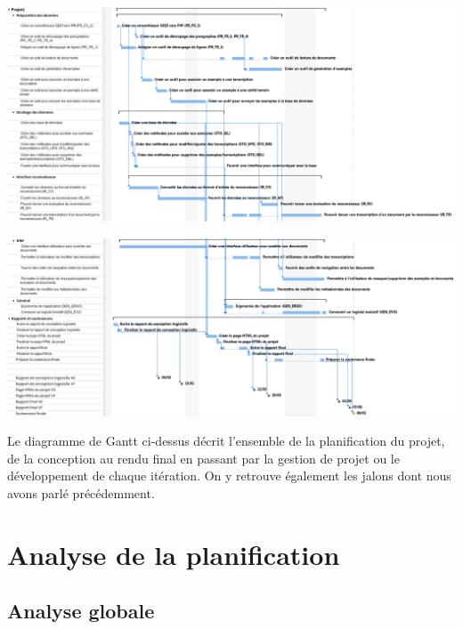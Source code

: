 \begin{mdframed}[frametitle={Figure 3 : Diagramme de Gantt du projet (1/2)}, innerbottommargin=10]
\begin{center}
\includegraphics[scale=0.35]{gantt_V2.1.PNG}
\end{center}
\end{mdframed}

\newpage

\begin{mdframed}[frametitle={Figure 4 : Diagramme de Gantt du projet (2/2)}, innerbottommargin=10]
\begin{center}
\includegraphics[scale=0.35]{gantt_V2.2.PNG}
\end{center}
\end{mdframed}

Le diagramme de Gantt ci-dessus décrit l’ensemble de la planification du projet, de la conception au rendu final en passant par la gestion de projet ou le développement de chaque itération. On y retrouve également les jalons dont nous avons parlé précédemment.

\section{Analyse de la planification}

\subsection{Analyse globale}

